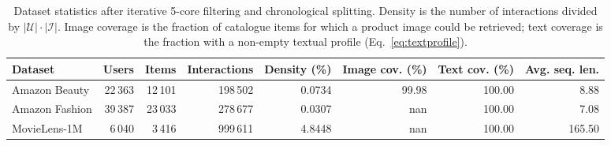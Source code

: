 \begin{table}[t]
\centering
\caption{Dataset statistics after iterative 5-core filtering and chronological splitting. Density is the number of interactions divided by $|\mathcal{U}|\cdot|\mathcal{I}|$. Image coverage is the fraction of catalogue items for which a product image could be retrieved; text coverage is the fraction with a non-empty textual profile (Eq.~\ref{eq:textprofile}).}
\label{tab:datasets}
\small
\begin{tabular}{lrrrrrrr}
\toprule
Dataset & Users & Items & Interactions & Density (\%) & Image cov. (\%) & Text cov. (\%) & Avg. seq. len. \\
\midrule
Amazon Beauty & 22\,363 & 12\,101 & 198\,502 & 0.0734 & 99.98 & 100.00 & 8.88 \\
Amazon Fashion & 39\,387 & 23\,033 & 278\,677 & 0.0307 & nan & 100.00 & 7.08 \\
MovieLens-1M & 6\,040 & 3\,416 & 999\,611 & 4.8448 & nan & 100.00 & 165.50 \\
\bottomrule
\end{tabular}
\end{table}
